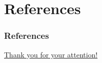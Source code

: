 \documentclass{beamer}
\begin{document}

\section*{References}

\begin{frame}[allowframebreaks]
\frametitle{References}
\printbibliography[heading = none]
\end{frame}


\begin{frame}
\centerline{\Huge\textcolor{structure}{\underline{Thank you for your attention!}}}
\end{frame}
\end{document}
